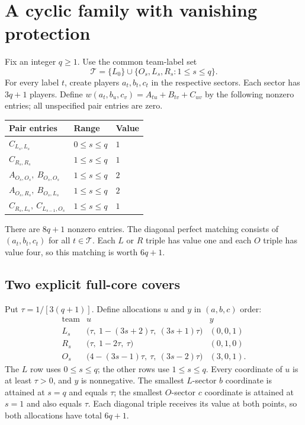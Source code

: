 \documentclass[11pt]{article}
\theoremstyle{remark}\newtheorem{remark}[theorem]{Remark}
\begin{document}
\section{A cyclic family with vanishing protection}
Fix an integer $q\geq1$. Use the common team-label set
\[
           \mathcal T=\{L_0\}\cup\{O_s,L_s,R_s:1\leq s\leq q\}.
\]
For every label $t$, create players $a_t,b_t,c_t$ in the respective
sectors. Each sector has $3q+1$ players. Define
$w(a_t,b_u,c_v)=A_{tu}+B_{tv}+C_{uv}$ by the following nonzero entries;
all unspecified pair entries are zero.
\begin{center}
\begin{tabular}{lll}\toprule
Pair entries & Range & Value\\\midrule
$C_{L_s,L_s}$ & $0\leq s\leq q$ & $1$\\
$C_{R_s,R_s}$ & $1\leq s\leq q$ & $1$\\
$A_{O_s,O_s},\ B_{O_s,O_s}$ & $1\leq s\leq q$ & $2$\\
$A_{O_s,R_s},\ B_{O_s,L_s}$ & $1\leq s\leq q$ & $2$\\
$C_{R_s,L_s},\ C_{L_{s-1},O_s}$ & $1\leq s\leq q$ & $1$\\\bottomrule
\end{tabular}
\end{center}
There are $8q+1$ nonzero entries. The diagonal perfect matching consists
of $(a_t,b_t,c_t)$ for all $t\in\mathcal T$. Each $L$ or $R$ triple has
value one and each $O$ triple has value four, so this matching is worth
$6q+1$.

\subsection{Two explicit full-core covers}
Put $\tau=1/[3(q+1)]$. Define allocations $u$ and $y$ in $(a,b,c)$ order:
\begin{equation}\label{eq:witnesses}
\begin{array}{c|c|c}
\text{team}&u&y\\\hline
L_s&\bigl(\tau,\ 1-(3s+2)\tau,\ (3s+1)\tau\bigr)&(0,0,1)\\
R_s&\bigl(\tau,\ 1-2\tau,\ \tau\bigr)&(0,1,0)\\
O_s&\bigl(4-(3s-1)\tau,\ \tau,\ (3s-2)\tau\bigr)&(3,0,1).
\end{array}
\end{equation}
The $L$ row uses $0\leq s\leq q$; the other rows use $1\leq s\leq q$.
Every coordinate of $u$ is at least $\tau>0$, and $y$ is nonnegative.
The smallest $L$-sector $b$ coordinate is attained at $s=q$ and equals
$\tau$; the smallest $O$-sector $c$ coordinate is attained at $s=1$
and also equals $\tau$. Each diagonal triple receives its value at
both points, so both allocations have total $6q+1$.
\end{document}
